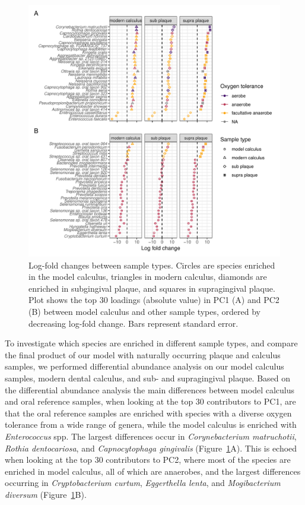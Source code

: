 \documentclass[
  b5paper,
]{book}
\begin{document}
\begin{figure}

{\centering \includegraphics{figures/byoc-valid-fig-diffabund-comp-1.pdf}

}

\caption{\label{fig-diffabund-comp}Log-fold changes between sample
types. Circles are species enriched in the model calculus, triangles in
modern calculus, diamonds are enriched in subgingival plaque, and
squares in supragingival plaque. Plot shows the top 30 loadings
(absolute value) in PC1 (A) and PC2 (B) between model calculus and other
sample types, ordered by decreasing log-fold change. Bars represent
standard error.}

\end{figure}

To investigate which species are enriched in different sample types, and
compare the final product of our model with naturally occurring plaque
and calculus samples, we performed differential abundance analysis on
our model calculus samples, modern dental calculus, and sub- and
supragingival plaque. Based on the differential abundance analysis the
main differences between model calculus and oral reference samples, when
looking at the top 30 contributors to PC1, are that the oral reference
samples are enriched with species with a diverse oxygen tolerance from a
wide range of genera, while the model calculus is enriched with
\emph{Enterococcus} spp. The largest differences occur in
\emph{Corynebacterium matruchotii}, \emph{Rothia dentocariosa}, and
\emph{Capnocytophaga gingivalis} (Figure~\ref{fig-diffabund-comp}A).
This is echoed when looking at the top 30 contributors to PC2, where
most of the species are enriched in model calculus, all of which are
anaerobes, and the largest differences occurring in
\emph{Cryptobacterium curtum}, \emph{Eggerthella lenta}, and
\emph{Mogibacterium diversum} (Figure~\ref{fig-diffabund-comp}B).
\end{document}
